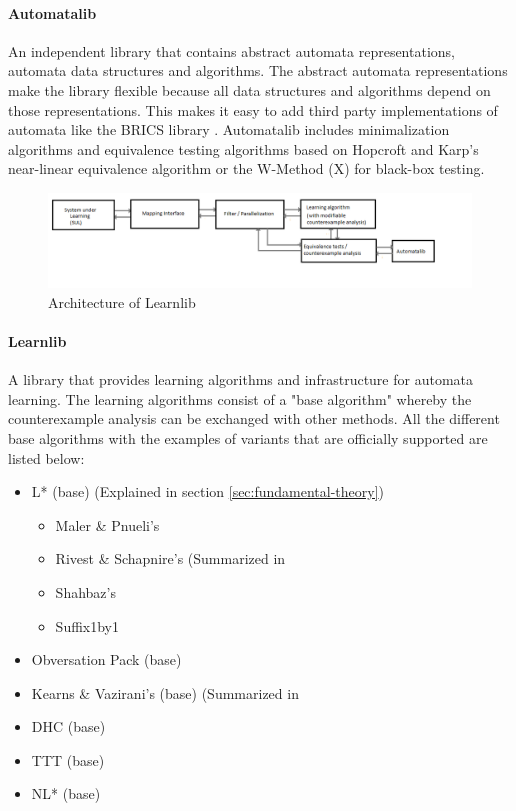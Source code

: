\documentclass[multi,crop=false,class=article]{standalone}
\begin{document}
\paragraph{Automatalib} An independent library that contains abstract 
automata representations, automata data structures and algorithms. The abstract 
automata representations make the library flexible because all data structures
and algorithms depend on those representations. This makes it easy to add 
third party implementations of automata like the BRICS library 
\cite{Alur2005}. Automatalib includes minimalization 
algorithms and equivalence testing algorithms based on Hopcroft and Karp's 
near-linear equivalence algorithm \cite{hopcroft1971} or the W-Method 
(X)   
for black-box testing. 

\begin{figure}[!ht]
	\includegraphics[width=\textwidth]{Tool_images/learnlib_architecture.png}
	\caption{Architecture of Learnlib}
	\label{fig:learnlib_arch}
\end{figure}

\paragraph{Learnlib} A library that provides learning algorithms and 
infrastructure for automata learning. The learning algorithms consist of a 
"base algorithm" whereby the counterexample analysis can be exchanged with 
other methods. All the different base algorithms with the examples of variants 
that are officially supported are listed below:

\begin{itemize}
	\item L* (base) (Explained in section \ref{sec:fundamental-theory})
	\begin{itemize}
		\item Maler \& Pnueli's \cite{Maler1995}
		\item Rivest \& Schapnire's (Summarized in 
		\item Shahbaz's \cite{Shahbaz2009}
		\item Suffix1by1 \cite{irfan2010}
	\end{itemize}
	\item Obversation Pack (base) \cite{howar2012a}
	\item Kearns \& Vazirani's (base) (Summarized in 
	\item DHC (base) \cite{Merten2012}
	\item TTT (base) %
	\item NL* (base) \cite{Bollig2009}
\end{itemize}
\end{document}

